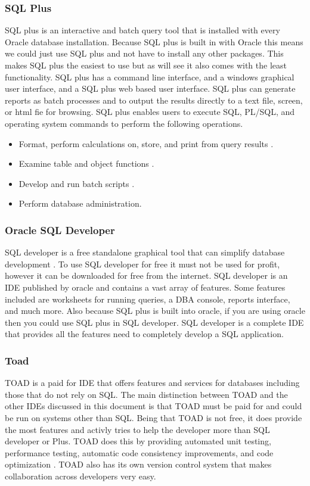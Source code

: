 \documentclass[draftclsnofoot, onecolumn, compsoc, 10pt]{IEEEtran}
\begin{document}
\subsubsection{SQL Plus}
SQL plus is an interactive and batch query tool that is installed with every Oracle database installation. 
Because SQL plus is built in with Oracle this means we could just use SQL plus and not have to install any other packages.
This makes SQL plus the easiest to use but as will see it also comes with the least functionality. 
SQL plus has a command line interface, and a windows graphical user interface, and a SQL plus web based user interface. 
SQL plus can generate reports as batch processes and to output the results directly to a text file, screen, or html fie for browsing.
SQL plus enables users to execute SQL, PL/SQL, and operating system commands to perform the following operations.
\begin{itemize}
	\item Format, perform calculations on, store, and print from query results \cite{SQL Plus Users Guide and Reference}.
	\item Examine table and object functions \cite{SQL Plus Users Guide and Reference}.
	\item Develop and run batch scripts \cite{SQL Plus Users Guide and Reference}.
	\item Perform database administration\cite{SQL Plus Users Guide and Reference}.
\end{itemize}

\subsubsection{Oracle SQL Developer}
SQL developer is a free standalone graphical tool that can simplify database development \cite{SQL Developer Documentation and Release 4.1}.
To use SQL developer for free it must not be used for profit, however it can be downloaded for free from the internet.
SQL developer is an IDE published by oracle and contains a vast array of features.
Some features included are worksheets for running queries, a DBA console, reports interface, and much more.
Also because SQL plus is built into oracle, if you are using oracle then you could use SQL plus in SQL developer. 
SQL developer is a complete IDE that provides all the features need to completely develop a SQL application.
 
\subsubsection{Toad}
TOAD is a paid for IDE that offers features and services for databases including those that do not rely on SQL.
The main distinction between TOAD and the other IDEs discussed in this document is that TOAD must be paid for and could be run on systems other than SQL.
Being that TOAD is not free, it does provide the most features and activly tries to help the developer more than SQL developer or Plus.
TOAD does this by providing automated unit testing, performance testing, automatic code consistency improvements, and code optimization \cite{Toad For Oracle}.
TOAD also has its own version control system that makes collaboration across developers very easy.
\end{document}
